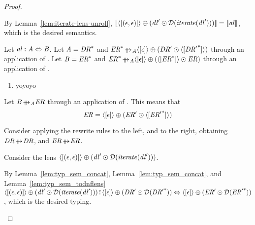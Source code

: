 \documentclass[numbers,10pt,preprint\ifanon ,nocopyrightspace\fi]{sigplanconf}
\begin{document}
\begin{proof}
\begin{case}[\AtomUnrollstarLeftRule{},\AtomUnrollstarLeftRule{}]
\begin{enumerate}
      By Lemma~\ref{lem:iterate-lens-unroll},
      $[ \! [\langle[(\epsilon,\epsilon)]\rangle
        \oplus
        (\mathit{dl}' \odot \mathcal{D}(\mathit{\mathit{iterate}(\mathit{dl}')}))] \! ]
      = [ \! [\mathit{al}] \! ]$, which is the desired semantics.
      
    \end{enumerate}
  \end{case}
  \begin{case}[\AtomUnrollstarLeftRule{},\AtomUnrollstarRightRule{}]
    Let $\mathit{al} : \mathit{A} \Leftrightarrow \mathit{B}$.
    Let $\mathit{A} = {\mathit{DR}}^*$ and $\StarOf{\DNFRegexAlt}
    \ParallelRewriteAtom
    \DNFOf{\SequenceOf{\EmptyString}} \OrDNF (\DNFRegex'
    \ConcatDNF \DNFOf{\SequenceOf{\StarOf{\DNFRegex'}}})$
    through an application of
    \AtomUnrollstarLeftRule{}.
    Let $\mathit{B} = {\mathit{ER}}^*$ and $\StarOf{\DNFRegexAlt}
    \ParallelRewriteAtom \DNFOf{\SequenceOf{\EmptyString}} \OrDNF
    (\DNFOf{\SequenceOf{\StarOf{\DNFRegexAlt}}} \ConcatDNF \DNFRegexAlt)$
    through an application of \AtomUnrollstarRightRule{}.

    \begin{enumerate}
      \item yoyoyo
    \end{enumerate}
    
    \begin{subcase}[\AtomUnrollstarLeftRule{}]
      Let $\AtomAlt \ParallelRewriteAtom \DNFRegexAlt$ through an application of
      \AtomUnrollstarLeftRule{}.  This means that
      \[
        \mathit{ER} = \langle[\epsilon]\rangle \oplus (\mathit{ER}'
        \odot \langle[{\mathit{ER}'}^*]\rangle)
      \]

      Consider applying the rewrite rules \IdentityRewriteRule{} to the left,
      and \IdentityRewriteRule{} to the right, obtaining
      $\DNFRegex{} \ParallelRewrite \DNFRegex{}$, and
      $\DNFRegexAlt{} \ParallelRewrite \DNFRegexAlt{}$.
    
      Consider the lens
      $\langle[(\epsilon,\epsilon)]\rangle \oplus
      (\mathit{dl}' \odot \mathcal{D}(\mathit{\mathit{iterate}(\mathit{dl}')}))$.
    
      By Lemma~\ref{lem:typ_sem_concat}, Lemma~\ref{lem:typ_sem_concat}, and
      Lemma~\ref{lem:typ_sem_todnflens}
      $\langle[(\epsilon,\epsilon)]\rangle \oplus
      (\mathit{dl}' \odot \mathcal{D}(\mathit{\mathit{iterate}(\mathit{dl}')}))
      \,\tilde{:}\, \langle[\epsilon]\rangle \oplus (\mathit{DR}'
      \odot \mathcal{D}({\mathit{DR}'}^*)) \Leftrightarrow
      \langle[\epsilon]\rangle \oplus (\mathit{ER}'
      \odot \mathcal{D}({\mathit{ER}'}^*))$, which is the desired
      typing.
    

\end{subcase}
\end{case}
\end{proof}
\end{document}

